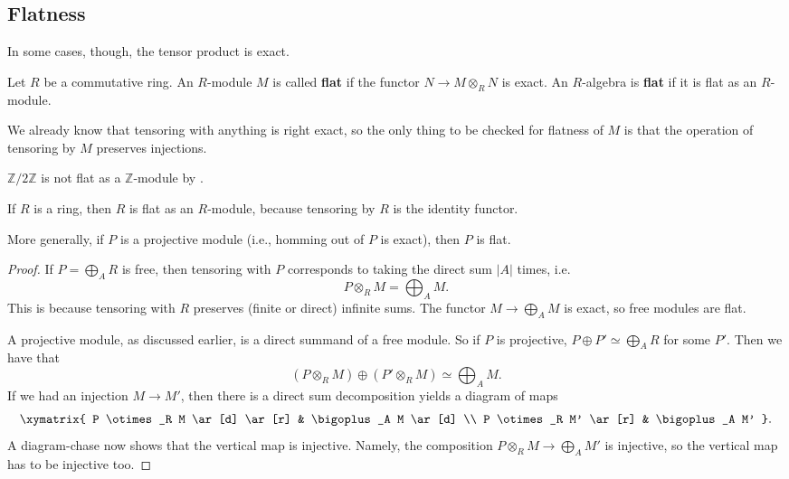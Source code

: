 \subsection{Flatness}
In some cases, though, the tensor product is exact.

\begin{definition} \label{flatdefn}
Let $R$ be a commutative ring. An $R$-module $M$ is called \textbf{flat} if the
functor $N \to M \otimes_R N$ is exact.  An $R$-algebra is \textbf{flat} if it is flat as an
$R$-module.
\end{definition}

We already know that tensoring with anything is right exact,
so the only thing to be checked for flatness of $M$ is that the operation of  tensoring by $M$
preserves injections.

\begin{example}
$\mathbb{Z}/2\mathbb{Z}$ is not flat as a $\mathbb{Z}$-module by
.

\end{example}

\begin{example} \label{projmoduleisflat}
If $R$ is a ring, then $R$ is flat as an $R$-module, because tensoring by $R$
is the identity functor.

More generally, if $P$ is a projective module (i.e., homming out of $P$
is exact), then $P$ is flat.
\end{example}
\begin{proof}
If $P  = \bigoplus_A R$ is free, then tensoring with $P$ corresponds to taking
the direct sum $|A|$ times, i.e.
\[ P \otimes_R M = \bigoplus_A M.  \]
This is because tensoring with $R$ preserves (finite or direct) infinite sums.
 The functor $M \to \bigoplus_A M$ is exact, so free
modules are flat.

A projective module, as discussed earlier, is a direct summand of a free
module. So if $P$ is projective, $P \oplus P' \simeq \bigoplus_A R$ for some
$P'$. Then we have that
\[ (P \otimes_R M) \oplus (P' \otimes_R M) \simeq \bigoplus_A M.  \]
If we had an injection $M \to M'$, then there is a direct sum decomposition
yields a diagram of maps
\[ \xymatrix{
P \otimes_R M \ar[d] \ar[r] &  \bigoplus_A M \ar[d]  \\
P \otimes_R M' \ar[r] &  \bigoplus_A M'
}.\]
A diagram-chase now shows that the vertical map is injective. Namely, the
composition $P \otimes_R M \to \bigoplus_A M'$ is injective, so the vertical
map has to be injective too.
\end{proof}

